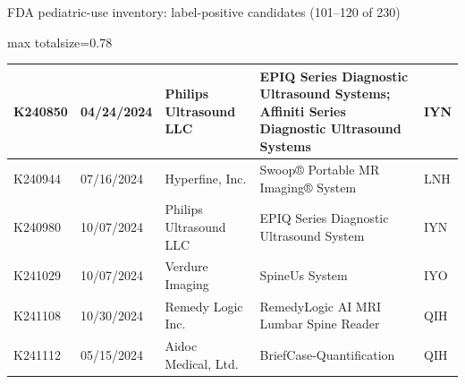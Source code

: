 \documentclass[aspectratio=169]{beamer}
\begin{document}
\begin{frame}[category=FDA appendix]{FDA pediatric-use inventory: label-positive candidates (101--120 of 230)}
\begin{adjustbox}{max totalsize={\textwidth}{0.78\textheight}}
\begin{tabular}{|p{}|p{}|p{}|p{}|p{}|}
K240850 & 04/24/2024 & Philips Ultrasound LLC & EPIQ Series Diagnostic Ultrasound Systems; Affiniti Series Diagnostic Ultrasound Systems & IYN \\ \hline
K240944 & 07/16/2024 & Hyperfine, Inc. & Swoop® Portable MR Imaging® System & LNH \\ \hline
K240980 & 10/07/2024 & Philips Ultrasound LLC & EPIQ Series Diagnostic Ultrasound System & IYN \\ \hline
K241029 & 10/07/2024 & Verdure Imaging & SpineUs System & IYO \\ \hline
K241108 & 10/30/2024 & Remedy Logic Inc. & RemedyLogic AI MRI Lumbar Spine Reader & QIH \\ \hline
K241112 & 05/15/2024 & Aidoc Medical, Ltd. & BriefCase-Quantification & QIH \\ \hline
\end{tabular}
\end{adjustbox}
\end{frame}
\end{document}
